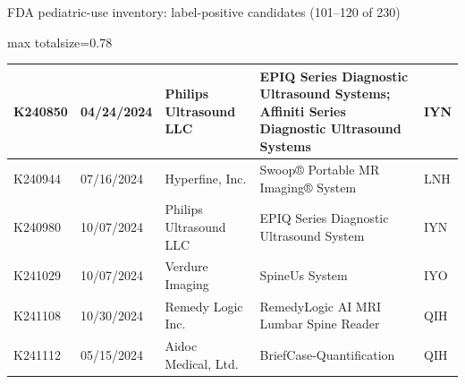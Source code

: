 \documentclass[aspectratio=169]{beamer}
\begin{document}
\begin{frame}[category=FDA appendix]{FDA pediatric-use inventory: label-positive candidates (101--120 of 230)}
\begin{adjustbox}{max totalsize={\textwidth}{0.78\textheight}}
\begin{tabular}{|p{}|p{}|p{}|p{}|p{}|}
K240850 & 04/24/2024 & Philips Ultrasound LLC & EPIQ Series Diagnostic Ultrasound Systems; Affiniti Series Diagnostic Ultrasound Systems & IYN \\ \hline
K240944 & 07/16/2024 & Hyperfine, Inc. & Swoop® Portable MR Imaging® System & LNH \\ \hline
K240980 & 10/07/2024 & Philips Ultrasound LLC & EPIQ Series Diagnostic Ultrasound System & IYN \\ \hline
K241029 & 10/07/2024 & Verdure Imaging & SpineUs System & IYO \\ \hline
K241108 & 10/30/2024 & Remedy Logic Inc. & RemedyLogic AI MRI Lumbar Spine Reader & QIH \\ \hline
K241112 & 05/15/2024 & Aidoc Medical, Ltd. & BriefCase-Quantification & QIH \\ \hline
\end{tabular}
\end{adjustbox}
\end{frame}
\end{document}
